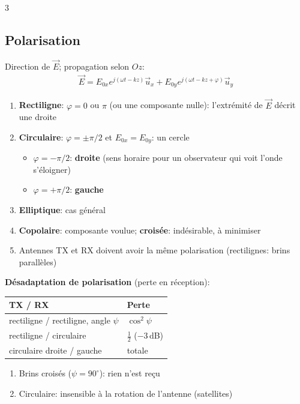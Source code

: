 \documentclass[12pt, a4paper]{article}
\newcommand{\ve}[1]{\vec{#1}}
\begin{document}
\begin{multicols*}{3}
	\subsection{Polarisation}
	Direction de $\ve E$; propagation selon $Oz$:
	\begin{gather*}
		\ve E=E_{0x}e^{j(\omega t-kz)}\ve u_x+E_{0y}e^{j(\omega t-kz+\varphi)}\ve u_y
	\end{gather*}
	\begin{enumerate}[\roman*.]
		\item \textbf{Rectiligne}: $\varphi=0$ ou $\pi$ (ou une composante nulle): l'extrémité de $\ve E$ décrit une droite
		\item \textbf{Circulaire}: $\varphi=\pm\pi/2$ et $E_{0x}=E_{0y}$: un cercle
		      \begin{itemize}
			      \item $\varphi=-\pi/2$: \textbf{droite} (sens horaire pour un observateur qui voit l'onde s'éloigner)
			      \item $\varphi=+\pi/2$: \textbf{gauche}
		      \end{itemize}
		\item \textbf{Elliptique}: cas général
		\item \textbf{Copolaire}: composante voulue; \textbf{croisée}: indésirable, à minimiser
		\item Antennes TX et RX doivent avoir la même polarisation (rectilignes: brins parallèles)
	\end{enumerate}
	\textbf{Désadaptation de polarisation} (perte en réception):

	\begin{tabular}{|l|l|}
		\hline
		\textbf{TX / RX}                       & \textbf{Perte}              \\
		\hline
		rectiligne / rectiligne, angle $\psi$ & $\cos^2\psi$ \\
		rectiligne / circulaire               & $\frac12$ ($-3$\,dB)        \\
		circulaire droite / gauche            & totale                      \\
		\hline
	\end{tabular}
	\begin{enumerate}[\roman*.]
		\item Brins croisés ($\psi=90^\circ$): rien n'est reçu
		\item Circulaire: insensible à la rotation de l'antenne (satellites)
	\end{enumerate}


\end{multicols*}
\end{document}
